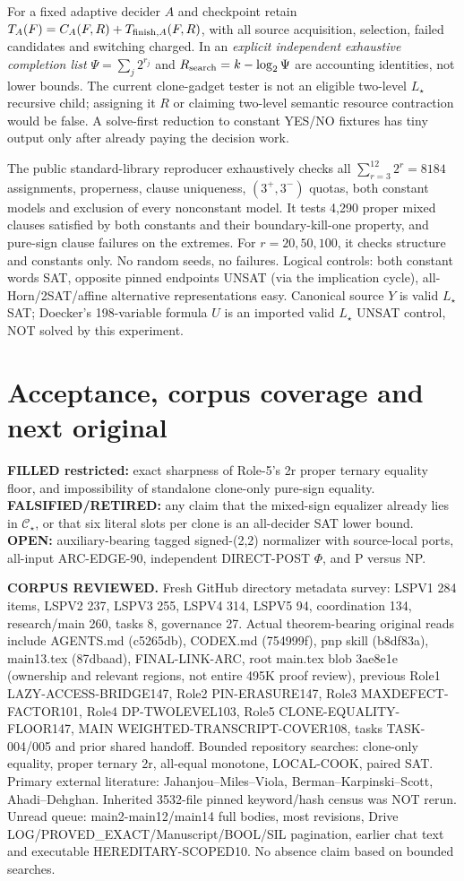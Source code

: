 \documentclass[11pt]{article}
\begin{document}
For a fixed adaptive decider $A$ and checkpoint retain $T_A(F)=C_A(F,R)+T_{{\rm finish},A}(F,R)$, with all source acquisition, selection, failed candidates and switching charged. In an \emph{explicit independent exhaustive completion list} $\Psi=\sum_j 2^{r_j}$ and $R_{\rm search}=k-\log_2\Psi$ are accounting identities, not lower bounds. The current clone-gadget tester is not an eligible two-level $L_\star$ recursive child; assigning it $R$ or claiming two-level semantic resource contraction would be false. A solve-first reduction to constant YES/NO fixtures has tiny output only after already paying the decision work.

The public standard-library reproducer exhaustively checks all $\sum_{r=3}^{12}2^r=8184$ assignments, properness, clause uniqueness, $(3^+,3^-)$ quotas, both constant models and exclusion of every nonconstant model. It tests 4,290 proper mixed clauses satisfied by both constants and their boundary-kill-one property, and pure-sign clause failures on the extremes. For $r=20,50,100$, it checks structure and constants only. No random seeds, no failures. Logical controls: both constant words SAT, opposite pinned endpoints UNSAT (via the implication cycle), all-Horn/2SAT/affine alternative representations easy. Canonical source $Y$ is valid $L_\star$ SAT; Doecker's 198-variable formula $U$ is an imported valid $L_\star$ UNSAT control, NOT solved by this experiment.

\section{Acceptance, corpus coverage and next original}
\textbf{FILLED restricted:} exact sharpness of Role-5's 2r proper ternary equality floor, and impossibility of standalone clone-only pure-sign equality. \textbf{FALSIFIED/RETIRED:} any claim that the mixed-sign equalizer already lies in $\mathcal C_\star$, or that six literal slots per clone is an all-decider SAT lower bound. \textbf{OPEN:} auxiliary-bearing tagged signed-(2,2) normalizer with source-local ports, all-input ARC-EDGE-90, independent DIRECT-POST $\Phi$, and P versus NP.

\textbf{CORPUS REVIEWED.} Fresh GitHub directory metadata survey: LSPV1 284 items, LSPV2 237, LSPV3 255, LSPV4 314, LSPV5 94, coordination 134, research/main 260, tasks 8, governance 27. Actual theorem-bearing original reads include AGENTS.md (c5265db), CODEX.md (754999f), pnp skill (b8df83a), main13.tex (87dbaad), FINAL-LINK-ARC, root main.tex blob 3ae8e1e (ownership and relevant regions, not entire 495K proof review), previous Role1 LAZY-ACCESS-BRIDGE147, Role2 PIN-ERASURE147, Role3 MAXDEFECT-FACTOR101, Role4 DP-TWOLEVEL103, Role5 CLONE-EQUALITY-FLOOR147, MAIN WEIGHTED-TRANSCRIPT-COVER108, tasks TASK-004/005 and prior shared handoff. Bounded repository searches: clone-only equality, proper ternary 2r, all-equal monotone, LOCAL-COOK, paired SAT. Primary external literature: Jahanjou--Miles--Viola, Berman--Karpinski--Scott, Ahadi--Dehghan. Inherited 3532-file pinned keyword/hash census was NOT rerun. Unread queue: main2-main12/main14 full bodies, most revisions, Drive LOG/PROVED_EXACT/Manuscript/BOOL/SIL pagination, earlier chat text and executable HEREDITARY-SCOPED10. No absence claim based on bounded searches.
\end{document}
